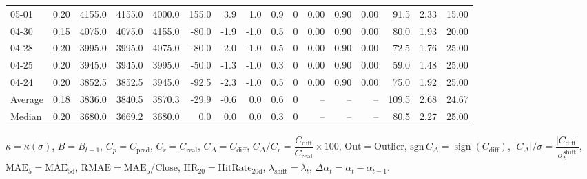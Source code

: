 \begin{threeparttable}
{\begin{tabular}{lrrrrrrrrrrrrrrr}
  05-01 &     0.20 & 4155.0 & 4155.0 & 4000.0 &      155.0 &            3.9 &                      1.0 &                 0.9 &              0 &       0.00 &      0.90 &           0.00 &             91.5 &            2.33 &                  15.00 \\
  04-30 &     0.15 & 4075.0 & 4075.0 & 4155.0 &      -80.0 &           -1.9 &                     -1.0 &                 0.5 &              0 &       0.00 &      0.90 &           0.00 &             80.0 &            1.93 &                  20.00 \\
  04-28 &     0.20 & 3995.0 & 3995.0 & 4075.0 &      -80.0 &           -2.0 &                     -1.0 &                 0.5 &              0 &       0.00 &      0.90 &           0.00 &             72.5 &            1.76 &                  25.00 \\
  04-25 &     0.20 & 3945.0 & 3945.0 & 3995.0 &      -50.0 &           -1.3 &                     -1.0 &                 0.3 &              0 &       0.00 &      0.90 &           0.00 &             59.0 &            1.48 &                  25.00 \\
  04-24 &     0.20 & 3852.5 & 3852.5 & 3945.0 &      -92.5 &           -2.3 &                     -1.0 &                 0.5 &              0 &       0.00 &      0.90 &           0.00 &             75.0 &            1.92 &                  25.00 \\
Average &     0.18 & 3836.0 & 3840.5 & 3870.3 &      -29.9 &           -0.6 &                      0.0 &                 0.6 &              0 &         -- &        -- &             -- &            109.5 &            2.68 &                  24.67 \\
 Median &     0.20 & 3680.0 & 3669.2 & 3680.0 &        0.0 &            0.0 &                      0.0 &                 0.3 &              0 &         -- &        -- &             -- &             80.5 &            2.27 &                  25.00 \\
\bottomrule
\end{tabular}
}
\begin{tablenotes}\footnotesize
\item $\kappa=\kappa(\sigma)$, $B=B_{t-1}$, $C_p=C_{\text{pred}}$, $C_r=C_{\text{real}}$, $C_\Delta=C_{\text{diff}}$, $C_\Delta/C_r=\dfrac{C_{\text{diff}}}{C_{\text{real}}}\times100$, $\mathrm{Out}=\text{Outlier}$, $\mathrm{sgn}\,C_\Delta=\operatorname{sign}(C_{\text{diff}})$, $|C_\Delta|/\sigma=\dfrac{|C_{\text{diff}}|}{\sigma_t^{\text{shift}}}$, $\mathrm{MAE}_5=\mathrm{MAE}_{5\text{d}}$, $\mathrm{RMAE}= \mathrm{MAE}_5 / \text{Close}$, $\mathrm{HR}_{20}=\mathrm{HitRate}_{20\text{d}}$, 
$\lambda_{\text{shift}}=\lambda_t$, 
$\Delta\alpha_t=\alpha_t-\alpha_{t-1}$.
\end{tablenotes}
\end{threeparttable}
\endgroup

